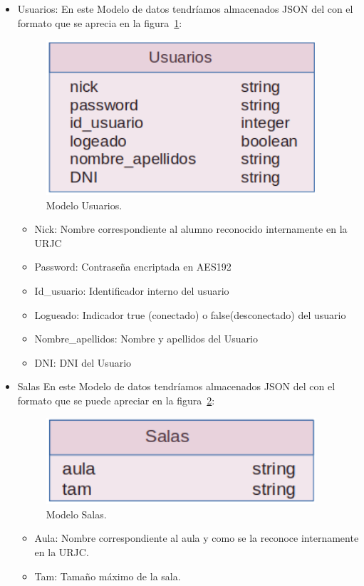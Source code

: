 \documentclass[a4paper, 12pt]{book}
\begin{document}
\begin{itemize}
	\item Usuarios: En este Modelo de datos tendríamos almacenados JSON del con el formato que se aprecia en la figura~\ref{fig:mongoDBUsuarios}:
	\begin{figure}[h!]
  	\centering
  	\includegraphics[width=10cm, keepaspectratio]{img/mongoDBUsuarios.png}
  	\caption{Modelo Usuarios.}\label{fig:mongoDBUsuarios}
	\end{figure}
		\begin{itemize}
		\item Nick: Nombre correspondiente al alumno reconocido internamente en la URJC
		\item Password: Contraseña encriptada en AES192
		\item Id\_usuario: Identificador interno del usuario
		\item Logueado: Indicador true (conectado) o false(desconectado) del usuario
		\item Nombre\_apellidos: Nombre y apellidos del Usuario
		\item DNI: DNI del Usuario
		\end{itemize}
	
	\item Salas En este Modelo de datos tendríamos almacenados JSON del con el formato que se puede apreciar en la figura~\ref{fig:mongoDBSalas}:
	\begin{figure}[h!]
  	\centering
  	\includegraphics[width=10cm, keepaspectratio]{img/mongoDBSalas.png}
  	\caption{Modelo Salas.}\label{fig:mongoDBSalas}
	\end{figure}
	
	\begin{itemize}
		\item Aula: Nombre correspondiente al aula y como se la reconoce internamente en la URJC.
		\item Tam: Tamaño máximo de la sala.
	\end{itemize}
	

\end{itemize}
\end{document}
